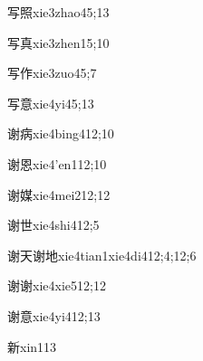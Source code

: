 \begin{verbete}{写照}{xie3zhao4}{5;13}
\end{verbete}

\begin{verbete}{写真}{xie3zhen1}{5;10}
\end{verbete}

\begin{verbete}{写作}{xie3zuo4}{5;7}
\end{verbete}

\begin{verbete}{写意}{xie4yi4}{5;13}
\end{verbete}

\begin{verbete}{谢病}{xie4bing4}{12;10}
\end{verbete}

\begin{verbete}{谢恩}{xie4'en1}{12;10}
\end{verbete}

\begin{verbete}{谢媒}{xie4mei2}{12;12}
\end{verbete}

\begin{verbete}{谢世}{xie4shi4}{12;5}
\end{verbete}

\begin{verbete}{谢天谢地}{xie4tian1xie4di4}{12;4;12;6}
\end{verbete}

\begin{verbete}{谢谢}{xie4xie5}{12;12}
\end{verbete}

\begin{verbete}{谢意}{xie4yi4}{12;13}
\end{verbete}

\begin{verbete}{新}{xin1}{13}
\end{verbete}

